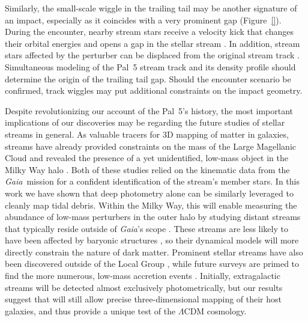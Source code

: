 \documentclass[twocolumn]{aastex62}
\newcommand{\gaia}{\textsl{Gaia}}
\begin{document}
Similarly, the small-scale wiggle in the trailing tail may be another signature of an impact, especially as it coincides with a very prominent gap (Figure~\ref{}).
During the encounter, nearby stream stars receive a velocity kick that changes their orbital energies and opens a gap in the stellar stream \citep[e.g.,][]{Erkal:2015b}.
In addition, stream stars affected by the perturber can be displaced from the original stream track \citep{Bonaca:2018b}.
Simultaneous modeling of the Pal~5 stream track and its density profile should determine the origin of the trailing tail gap.
Should the encounter scenario be confirmed, track wiggles may put additional constraints on the impact geometry.

Despite revolutionizing our account of the Pal~5's history, the most important implications of our discoveries may be regarding the future studies of stellar streams in general.
As valuable tracers for 3D mapping of matter in galaxies, streams have already provided constraints on the mass of the Large Magellanic Cloud \citep{Erkal:2019} and revealed the presence of a yet unidentified, low-mass object in the Milky Way halo \citep{Bonaca:2018b}.
Both of these studies relied on the kinematic data from the \gaia\ mission for a confident identification of the stream's member stars.
In this work we have shown that deep photometry alone can be similarly leveraged to cleanly map tidal debris.
Within the Milky Way, this will enable measuring the abundance of low-mass perturbers in the outer halo by studying distant streams that typically reside outside of \gaia's scope \citep[cf.][]{Ibata:2019}.
These streams are less likely to have been affected by baryonic structures \citep[e.g.,][]{Banik:2019}, so their dynamical models will more directly constrain the nature of dark matter.
Prominent stellar streams have also been discovered outside of the Local Group \citep[e.g.,][]{Martinez-Delgado:2010, Kado-Fong:2018}, while future surveys are primed to find the more numerous, low-mass accretion events \citep{Pearson:2019}.
Initially, extragalactic streams will be detected almost exclusively photometrically, but our results suggest that will still allow precise three-dimensional mapping of their host galaxies, and thus provide a unique test of the $\Lambda$CDM cosmology.
\end{document}
